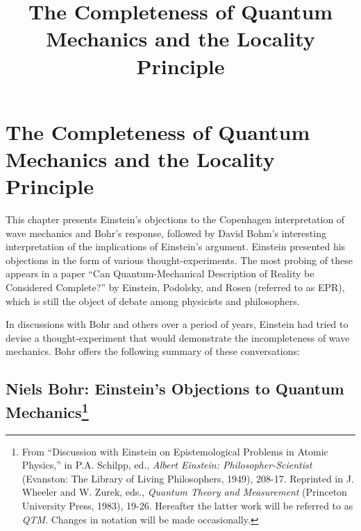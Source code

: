 \documentclass[11pt]{memoir}
\title{The Completeness of Quantum Mechanics and the Locality Principle}
\begin{document}
\section*{The Completeness of Quantum Mechanics and the Locality Principle}

This chapter presents Einstein's objections to the Copenhagen
interpretation of wave mechanics and Bohr's response, followed by David
Bohm's interesting interpretation of the implications of Einstein's
argument. Einstein presented his objections in the form of various
thought-experiments. The most probing of these appears in a paper ``Can
Quantum-Mechanical Description of Reality be Considered Complete?'' by
Einstein, Podolsky, and Rosen (referred to as EPR), which is still the
object of debate among physicists and philosophers.

In discussions with Bohr and others over a period of years, Einstein had
tried to devise a thought-experiment that would demonstrate the
incompleteness of wave mechanics. Bohr offers the following summary of
these conversations:

\subsection*{Niels Bohr: Einstein's Objections to Quantum Mechanics\footnote{From
  ``Discussion with Einstein on Epistemological Problems in Atomic
  Physics,'' in P.A. Schilpp, ed., \emph{Albert Einstein:
  Philosopher-Scientist} (Evanston: The Library of Living Philosophers,
  1949), 208-17. Reprinted in J. Wheeler and W. Zurek, eds.,
  \emph{Quantum Theory and Measurement} (Princeton University Press,
  1983), 19-26. Hereafter the latter work will be referred to as
  \emph{QTM}. Changes in notation will be made occasionally.}}
\end{document}
